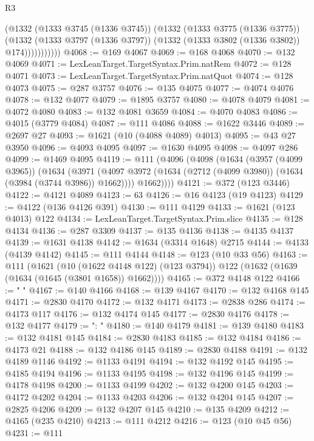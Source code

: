 \begin{lexlean}{R3}
\begin{coremodule}
                  (@1332
                    (@1333 @3745 (@1336 @3745))
                    (@1332
                      (@1333 @3775 (@1336 @3775))
                      (@1332
                        (@1333 @3797 (@1336 @3797))
                        (@1332 (@1333 @3802 (@1336 @3802)) @174)))))))))))
@4068 := @169 @4067
@4069 := @168 @4068
@4070 := @132 @4069
@4071 := LexLeanTarget.TargetSyntax.Prim.natRem
@4072 := @128 @4071
@4073 := LexLeanTarget.TargetSyntax.Prim.natQuot
@4074 := @128 @4073
@4075 := @287 @3757
@4076 := @135 @4075
@4077 := @4074 @4076
@4078 := @132 @4077
@4079 := @1895 @3757
@4080 := @4078 @4079
@4081 := @4072 @4080
@4083 := @132 @4081 @3659
@4084 := @4070 @4083
@4086 := @4015 (@3779 @4084)
@4087 := @111 @4086
@4088 := @1622 @3446
@4089 := @2697 @27
@4093 := @1621 (@10 (@4088 @4089) @4013)
@4095 := @43 @27 @3950
@4096 := @4093 @4095
@4097 := @1630 @4095
@4098 := @4097 @286
@4099 := @1469 @4095
@4119 := @111
    (@4096
      (@4098
        (@1634
          (@3957 (@4099 @3965))
          (@1634
            (@3971 (@4097 @3972 (@1634 (@2712 (@4099 @3980)) (@1634 (@3984 (@3744 @3986)) @1662))))
            @1662))))
@4121 := @372 (@123 @3446)
@4122 := @4121 @4089
@4123 := 63
@4126 := @16 @4123 (@19 @4123)
@4129 := @4122 (@136 @4126 @391)
@4130 := @111 @4129
@4133 := @1621 (@123 @4013) @122
@4134 := LexLeanTarget.TargetSyntax.Prim.slice
@4135 := @128 @4134
@4136 := @287 @3309
@4137 := @135 @4136
@4138 := @4135 @4137
@4139 := @1631 @4138
@4142 := @1634 (@3314 @1648) @2715
@4144 := @4133 (@4139 @4142)
@4145 := @111 @4144
@4148 := @123 (@10 @33 @56)
@4163 := @111
    (@1621
      (@10 (@1622 @4148 @122) (@123 @3794))
      @122
      (@1632 (@1639 (@1634 (@1645 (@3801 @1658)) @1662))))
@4165 := @372 @4148 @122
@4166 := "      "
@4167 := @140 @4166
@4168 := @139 @4167
@4170 := @132 @4168 @145
@4171 := @2830 @4170
@4172 := @132 @4171
@4173 := @2838 @286
@4174 := @4173 @117
@4176 := @132 @4174 @145
@4177 := @2830 @4176
@4178 := @132 @4177
@4179 := ": "
@4180 := @140 @4179
@4181 := @139 @4180
@4183 := @132 @4181 @145
@4184 := @2830 @4183
@4185 := @132 @4184
@4186 := @4173 @21
@4188 := @132 @4186 @145
@4189 := @2830 @4188
@4191 := @132 @4189 @1146
@4192 := @1133 @4191
@4194 := @132 @4192 @145
@4195 := @4185 @4194
@4196 := @1133 @4195
@4198 := @132 @4196 @145
@4199 := @4178 @4198
@4200 := @1133 @4199
@4202 := @132 @4200 @145
@4203 := @4172 @4202
@4204 := @1133 @4203
@4206 := @132 @4204 @145
@4207 := @2825 @4206
@4209 := @132 @4207 @145
@4210 := @135 @4209
@4212 := @4165 (@235 @4210)
@4213 := @111 @4212
@4216 := @123 (@10 @45 @56)
@4231 := @111

\end{coremodule}
\end{lexlean}
